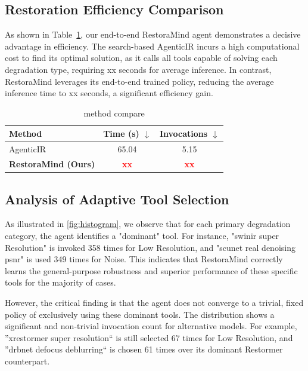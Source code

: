 \noindent\subsection{Restoration Efficiency Comparison}
As shown in Table~\ref{tab:2speed}, our end-to-end RestoraMind agent demonstrates a decisive advantage in efficiency. The search-based AgenticIR incurs a high computational cost to find its optimal solution, as it calls all tools capable of solving each degradation type, requiring xx seconds for average inference. In contrast, RestoraMind leverages its end-to-end trained policy, reducing the average inference time to xx seconds, a significant efficiency gain.
% 

\begin{table}[h!] %
\centering
\caption{method compare}
\label{tab:time comparison}
\begin{tabular}{lcc}
\toprule
\textbf{Method} & \textbf{Time (s) $\downarrow$} & \textbf{Invocations $\downarrow$} \\
\midrule
AgenticIR     & 65.04                & 5.15                \\
\textbf{RestoraMind (Ours)} & \textbf{\textcolor{red}{xx}} & \textbf{\textcolor{red}{xx}} \\
\bottomrule
\end{tabular}
\label{tab:2speed}
\end{table}

\noindent\subsection{Analysis of Adaptive Tool Selection}
As illustrated in \cref{fig:histogram}, we observe that for each primary degradation category, the agent identifies a "dominant" tool. For instance, "swinir super Resolution" is invoked 358 times for Low Resolution, and "scunet real denoising psnr" is used 349 times for Noise. This indicates that RestoraMind correctly learns the general-purpose robustness and superior performance of these specific tools for the majority of cases.

However, the critical finding is that the agent does not converge to a trivial, fixed policy of exclusively using these dominant tools. The distribution shows a significant and non-trivial invocation count for alternative models. For example,  ”xrestormer super resolution“ is still selected 67 times for Low Resolution, and ”drbnet defocus deblurring“ is chosen 61 times over its dominant Restormer counterpart.


